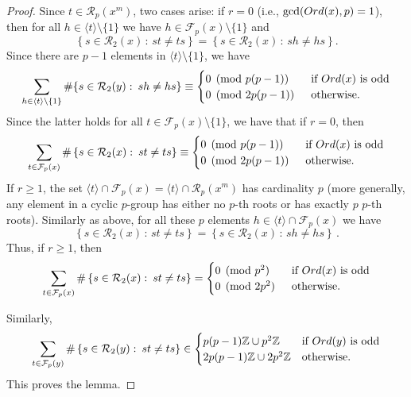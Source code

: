 \documentclass[10pt,a4paper]{amsart}
\newcommand{\Ord}{{\rm Ord}}
\newcommand{\Z}{\mathbb Z}
\begin{document}
\begin{proof}
    Since $t\in \mathcal{R}_p(x^m)$, two cases arise: if $r=0$ (i.e., $\gcd(\Ord(x),p)=1$), then for all $h\in\langle t\rangle\setminus \{1\} $ we have $h\in \mathcal{F}_p(x)\setminus\{1\}$ and \[\left\{s\in \mathcal{R}_2(x)\, \colon\,  st\ne ts\right\}=\left\{s\in \mathcal{R}_2(x)\, \colon\,  sh\ne hs\right\}.\]
    Since there are $p-1$ elements in $\langle t\rangle\setminus\{1\}$, we have \[\sum_{h\in \langle t\rangle\setminus\{1\}} \#\{s\in \mathcal{R}_2(y)\, \colon\,  sh\ne hs\}\equiv\begin{cases}
        0\pmod{ p(p-1)}\quad&\text{if } \Ord(x)\text{ is odd}\\
        0\pmod{ 2p(p-1)} &\text{otherwise}.
    \end{cases}\]
    Since the latter holds for all $t\in \mathcal{F}_p(x)\setminus\{1\}$, we have that if $r=0$, then \[\sum_{t\in \mathcal{F}_p(x)}\#\left\{s\in \mathcal{R}_2(x)\, \colon\,  st\ne ts\right\}\equiv\begin{cases}
        0\pmod{ p(p-1)}\quad&\text{if } \Ord(x)\text{ is odd}\\
        0\pmod{ 2p(p-1)} &\text{otherwise}.
    \end{cases} \] 
    If $r\ge 1$, the set $\langle t\rangle\cap\mathcal{F}_p(x)=\langle t\rangle\cap\mathcal{R}_p(x^m)$ has cardinality $p$ (more generally, any element in a cyclic $p$-group has either no $p$-th roots or has exactly $p$ $p$-th roots). Similarly as above, for all these $p$ elements $h\in \langle t\rangle\cap\mathcal{F}_p(x) $ we have
    \[\left\{s\in \mathcal{R}_2(x)\, \colon\,  st\ne ts\right\}=\left\{s\in \mathcal{R}_2(x)\, \colon\,  sh\ne hs\right\}\, .\]
    Thus, if $r\ge1$, then
    \[\sum_{t\in \mathcal{F}_p(x)}\#\left\{s\in \mathcal{R}_2(x)\, \colon\,  st\ne ts\right\}=\begin{cases}
        0\pmod{ p^2}\quad&\text{if } \Ord(x)\text{ is odd}\\
        0\pmod{ 2p^2} &\text{otherwise}.
    \end{cases} \]  
    
    Similarly,  \[\sum_{t\in \mathcal{F}_p(y)}\#\left\{s\in \mathcal{R}_2(y)\, \colon\,  st\ne ts\right\}\in\begin{cases}
        p(p-1)\Z\cup p^2\Z\quad&\text{if } \Ord(y)\text{ is odd}\\
        2p(p-1)\Z\cup 2p^2\Z &\text{otherwise}.
    \end{cases} \]  
    This proves the lemma.
\end{proof}
\end{document}
